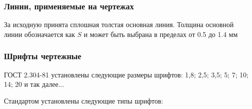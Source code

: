 \documentclass{article}
\begin{document}
\subsubsection{Линии, применяемые на чертежах}

За исходную принята сплошная толстая основная линия. Толщина основной линии обозначается как $S$ и может быть выбрана в пределах от 0.5 до 1.4 мм

\subsubsection{Шрифты чертежные}

ГОСТ 2.304-81 установлены следующие размеры шрифтов: 1,8; 2,5; 3,5; 5; 7; 10; 14; 20 и так далее...

Стандартом установлены следующие типы шрифтов:

\begin{multienumerate}
\end{multienumerate}
\end{document}
